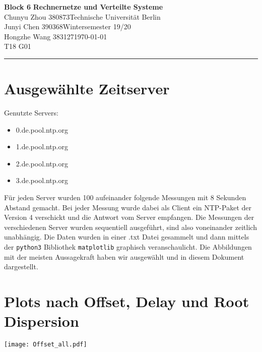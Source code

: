 \documentclass[a4paper, 11pt, fleqn, notitlepage, egregdoesnotlikesansseriftitles]{scrartcl}
\title{\aufgabe}
\subtitle{\modul}
\author{\name}
\date{\datum}
\newcommand{\emptyline}{\vspace{\baselineskip}}     %
\newcommand{\aufgabe}{Block 6}
\newcommand{\modul}{Rechnernetze und Verteilte Systeme}
\newcommand{\sem}{Wintersemester 19/20}
\newcommand{\autorA}{Chunyu Zhou 380873}
\newcommand{\autorB}{Junyi Chen 390368}
\newcommand{\autorC}{Hongzhe Wang 383127}
\newcommand{\uni}{Technische Universität Berlin}
\newcommand{\datum}{\today}
\begin{document}
\thispagestyle{scrplain}

\noindent\Large
\textbf{\aufgabe} \hfill \textbf{\modul} \\
\normalsize
\autorA \hfill \uni \\
\autorB \hfill \sem \\
\autorC \hfill \datum \\
\autorD \hfill T18 G01 \\
\rule{\textwidth}{0.1mm}



\section*{Ausgewählte Zeitserver}

Genutzte Servers:
\begin{itemize}
    \item 0.de.pool.ntp.org
    \item 1.de.pool.ntp.org
    \item 2.de.pool.ntp.org
    \item 3.de.pool.ntp.org
\end{itemize}

\emptyline
Für jeden Server wurden 100 aufeinander folgende Messungen mit 8 Sekunden Abstand gemacht.
Bei jeder Messung wurde dabei als Client ein NTP-Paket der Version 4 verschickt und die Antwort vom Server empfangen. Die Messungen der verschiedenen Server wurden sequentiell ausgeführt, sind also voneinander zeitlich unabhängig. Die Daten wurden in einer .txt Datei gesammelt und dann mittels der \verb+python3+ Bibliothek \verb+matplotlib+ graphisch veranschaulicht. Die Abbildungen mit der meisten Aussagekraft haben wir ausgewählt und in diesem Dokument dargestellt.

\newpage
\section*{Plots nach Offset, Delay und Root Dispersion}
\vspace{-\baselineskip}

\begin{center}
    \texttt{[image: Offset\_all.pdf]}
    \label{fig:offset}
\end{center}
\end{document}
